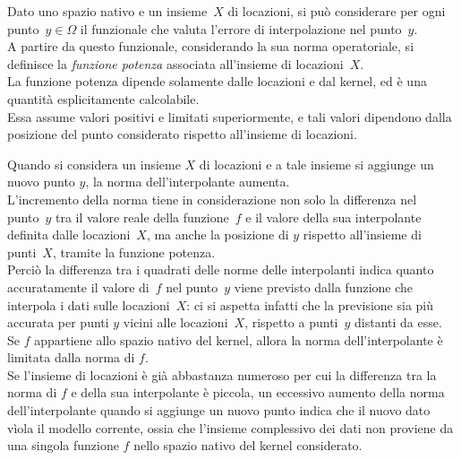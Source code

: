 \rf Dato uno spazio nativo e un insieme~$X$ di locazioni, si può considerare per ogni punto~$y\in\Omega$ il funzionale che valuta l'errore di interpolazione nel punto~$y$.\\
A partire da questo funzionale, considerando la sua norma operatoriale, si definisce la {\em funzione potenza} associata all'insieme di locazioni~$X$.\\
La funzione potenza dipende solamente dalle locazioni e dal kernel, ed è una quantità esplicitamente calcolabile.\\
Essa assume valori positivi e limitati superiormente, e tali valori dipendono dalla posizione del punto considerato rispetto all'insieme di locazioni.



\rf Quando si considera un insieme $X$ di locazioni e a tale insieme si aggiunge un nuovo punto $y$, la norma dell'interpolante aumenta.\\
 L'incremento della norma tiene in considerazione non solo la differenza nel punto~$y$ tra il valore reale della funzione~$f$ e il valore della sua interpolante definita dalle locazioni~$X$, ma anche la posizione di $y$ rispetto all'insieme di punti~$X$, tramite la funzione potenza.\\
Perciò la differenza tra i quadrati delle norme delle interpolanti indica quanto accuratamente il valore di~$f$ nel punto~$y$ viene previsto dalla funzione che interpola i dati sulle locazioni~$X$: ci si aspetta infatti che la previsione sia più accurata per punti $y$ vicini alle locazioni~$X$, rispetto a punti~$y$ distanti da esse.\\
Se $f$ appartiene allo spazio nativo del kernel, allora la  norma  dell’interpolante è limitata dalla norma di $f$.\\
Se l’insieme di locazioni è già abbastanza numeroso per cui la differenza tra la norma di $f$ e della sua interpolante è piccola,  un eccessivo aumento della norma dell’interpolante quando si aggiunge un nuovo punto indica che il nuovo dato vìola il modello corrente, ossia che l’insieme complessivo dei dati non proviene da una singola funzione $f$ nello spazio nativo del kernel considerato.



